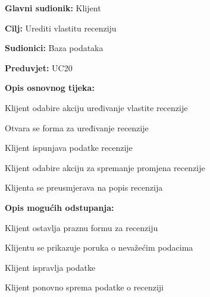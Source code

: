 \noindent {}
\begin{packed_item}
	
	\item \textbf{Glavni sudionik:} Klijent
	\item  \textbf{Cilj:} Urediti vlastitu recenziju
	\item  \textbf{Sudionici:} Baza podataka
	\item  \textbf{Preduvjet:} UC20
	\item  \textbf{Opis osnovnog tijeka:}
	
	\item[] \begin{packed_enum}
		
		\item Klijent odabire akciju uređivanje vlastite recenzije
		\item Otvara se forma za uređivanje recenzije
		\item Klijent ispunjava podatke recenzije
		\item Klijent odabire akciju za spremanje promjena recenzije
		\item Klijenta se preusmjerava na popis recenzija
		
		\end{packed_enum}
		
	\item  \textbf{Opis mogućih odstupanja:}
	\item[] \begin{packed_item}
		
		\item[3.a] Klijent ostavlja praznu formu za recenziju
		\item[] \begin{packed_enum}
			
			\item Klijentu se prikazuje poruka o nevažećim podacima
			\item Klijent ispravlja podatke
			\item Klijent ponovno sprema podatke o recenziji
			
		\end{packed_enum}
		\end{packed_item}
		
\end{packed_item}

